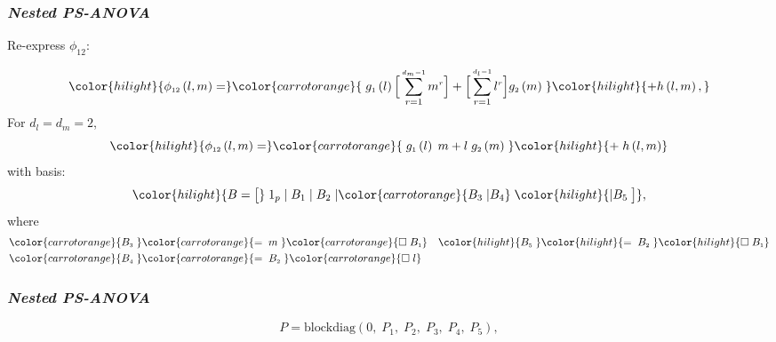 \documentclass[12pt]{beamer}
\newcommand{\newmaththought}[1]{{ \color{hilight} {#1}}}
\newcommand{\carrotorangemath}[1]{{ \color{carrotorange} {#1}}}
\newcommand{\ms}{\scriptscriptstyle}
\begin{document}
\begin{frame}
\frametitle{\emph{Nested PS-ANOVA}}

Re-express $\phi_{\ms{12}}$:

\begin{align*}
\newmaththought{ \phi_{\ms{12}}\left(l,m\right)  =} \carrotorangemath{\; g_{\ms 1}\left(l\right) \Big[ \sum_{r=1}^{\ms{d_m-1}} m^{\ms r}\Big] + \Big[ \sum_{r=1}^{\ms{d_l-1}} l^{\ms r} \Big] g_{\ms 2}\left(m\right)\;}  \newmaththought{+ h\left( l,m \right), } 
\end{align*}
\noindent
For $d_l = d_m = 2$,
\[
\newmaththought{ \phi_{\ms{12}}\left(l,m\right)  =} \carrotorangemath{\; g_{\ms 1}\left(l\right) \; m+ l \; g_{\ms 2}\left(m\right)\;}\newmaththought{ + \; h\left( l,m \right) } 
\]
with basis:
\begin{equation} \label{eq:nested-SANOVA-basis-matrix}
\color{hilight}{B = \big[ } \; 1_p \; \vert \;  B_1  \; \vert \;   B_2 \; \vert \carrotorangemath{ B_3 \; \vert B_4 }\;\newmaththought{ \vert B_5 \; \big]},
\end{equation}
\noindent
where
\begin{align*}
\carrotorangemath{B_{\ms 3}\;} &\carrotorangemath{= \;m \;} \carrotorangemath{ \square \;  B_{\ms 1}}  &  \newmaththought{B_{\ms 5}\;}\newmaththought{=\; B_{\ms 2} \;} \newmaththought{ \square \; B_{\ms 1} } \\
 \carrotorangemath{B_{\ms 4}\;}&\carrotorangemath{=\; B_{\ms 2} \;} \carrotorangemath{ \square \; l } &
\end{align*}


\end{frame}




\begin{frame}
\frametitle{\emph{Nested PS-ANOVA}}

\begin{equation} \label{eq:PSANOVA-penalty}
P = \mbox{blockdiag}\left(0,\; P_1, \; P_2, \; P_{3},\; P_4, \; P_{5} \right),
\end{equation}


\end{frame}
\end{document}
